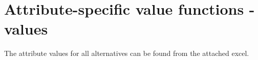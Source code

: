 \documentclass{article}
\begin{document}

\section{Attribute-specific value functions - values}
		The attribute values for all alternatives can be found from the attached excel.
\end{document}
